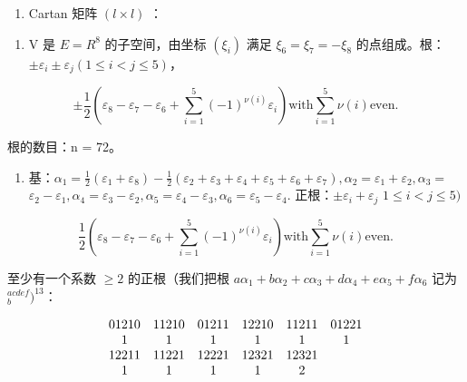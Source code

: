 \begin{enumerate}
\def\labelenumi{(\Roman{enumi})}
\setcounter{enumi}{12}
\tightlist
\item
  Cartan 矩阵 \((l\times l)\) ：
\end{enumerate}


\begin{enumerate}
\def\labelenumi{(\Roman{enumi})}
\tightlist
\item
  V 是 \(E = R^{8}\) 的子空间，由坐标 \((\xi_{i})\) 满足 \(\xi_{6} = \xi_{7} = -\xi_{8}\) 的点组成。根：\(\pm\varepsilon_{i} \pm \varepsilon_{j} (1 \leqslant i < j \leqslant 5)\)，
\end{enumerate}

\[
\pm \frac {1}{2} (\varepsilon_ {8} - \varepsilon_ {7} - \varepsilon_ {6} + \sum_ {i = 1} ^ {5} (- 1) ^ {\nu (i)} \varepsilon_ {i}) \text {with} \sum_ {i = 1} ^ {5} \nu (i) \text {even.}
\]

根的数目：n = 72。

\begin{enumerate}
\def\labelenumi{(\Roman{enumi})}
\setcounter{enumi}{1}
\tightlist
\item
  基：\(\alpha_{1} = \frac{1}{2} (\varepsilon_{1} + \varepsilon_{8}) - \frac{1}{2} (\varepsilon_{2} + \varepsilon_{3} + \varepsilon_{4} + \varepsilon_{5} + \varepsilon_{6} + \varepsilon_{7}),\alpha_{2} = \varepsilon_{1} + \varepsilon_{2},\alpha_{3} =\) \(\varepsilon_2 - \varepsilon_1,\alpha_4 = \varepsilon_3 - \varepsilon_2,\alpha_5 = \varepsilon_4 - \varepsilon_3,\alpha_6 = \varepsilon_5 - \varepsilon_4.\) 正根：\(\pm \varepsilon_i + \varepsilon_j\) \(1\leqslant i <   j\leqslant 5)\)
\end{enumerate}

\[
\frac {1}{2} \left(\varepsilon_ {8} - \varepsilon_ {7} - \varepsilon_ {6} + \sum_ {i = 1} ^ {5} (- 1) ^ {\nu (i)} \varepsilon_ {i}\right) \text {with} \sum_ {i = 1} ^ {5} \nu (i) \text {even}.
\]

至少有一个系数 \(\geqslant 2\) 的正根（我们把根 \(a\alpha_{1} + b\alpha_{2} + c\alpha_{3} + d\alpha_{4} + e\alpha_{5} + f\alpha_{6}\) 记为 \({ }^{a c d e f}_{b})^{13}\)：

\[
\begin{array}{c c c c c c} 0   1   2   1   0 & 1   1   2   1   0 & 0   1   2   1   1 & 1   2   2   1   0 & 1   1   2   1   1 & 0   1   2   2   1 \\ 1 & 1 & 1 & 1 & 1 & 1 \\ 1   2   2   1   1 & 1   1   2   2   1 & 1   2   2   2   1 & 1   2   3   2   1 & 1   2   3   2   1 \\ 1 & 1 & 1 & 1 & 2 \end{array}
\]

